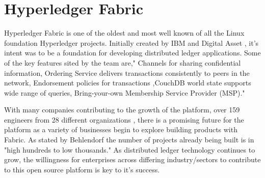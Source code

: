\section{Hyperledger Fabric}

Hyperledger Fabric is one of the oldest and most well known of all the 
Linux foundation Hyperledger projects. Initially created by IBM and Digital 
Asset , it’s intent was to be a foundation for developing distributed ledger 
applications. Some of the key features sited by the team are," Channels for 
sharing confidential information, Ordering Service delivers transactions 
consistently to peers in the network, Endorsement policies for transactions
,CouchDB world state supports wide range of queries, Bring-your-own Membership 
Service Provider (MSP)."\cite{Hyperledger Fabric}

With many companies contributing to the growth of the platform, over 159 engineers
from 28 different organizations \cite{Behlendorf Interview}, there is a promising
future for the platform as a variety of businesses begin to explore building products
with Fabric. As stated by Behlendorf the number of projects already being built is in
"high hundreds to low thousands." \cite{Behlendorf Interview} As distributed ledger
technology continues to grow, the willingness for enterprises across differing
industry/sectors to contribute to this open source platform is key to it's 
success.

